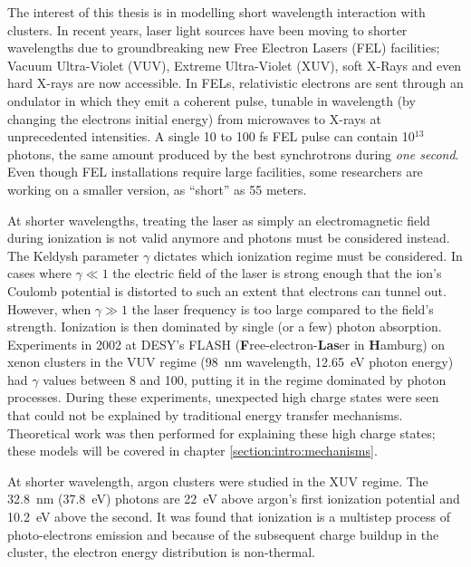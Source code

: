 The interest of this thesis is in modelling short wavelength interaction with
clusters. In recent years, laser light sources have been moving to shorter
wavelengths due to groundbreaking new Free Electron Lasers (FEL)
facilities; Vacuum Ultra-Violet (VUV), Extreme Ultra-Violet (XUV), soft X-Rays
and even hard X-rays are now accessible. In FELs, relativistic electrons are sent
through an ondulator in which they emit a coherent pulse, tunable in wavelength
(by changing the electrons initial energy)
from microwaves to X-rays\cite{Brabec2009,Ackermann2007a,Pellegrini2012} at
unprecedented intensities. A single 10 to 100 fs FEL pulse can contain 10$^{13}$
photons, the same amount produced by the best synchrotrons during
\textit{one second}\cite{Bostedt2009}. Even though FEL installations require
large facilities, some researchers are working on a smaller version, as
``short'' as 55 meters\cite{Shintake2008}.

At shorter wavelengths, treating the laser as simply an electromagnetic field
during ionization is not valid anymore and photons must be considered instead.
The Keldysh parameter $\gamma$ dictates which ionization regime must be considered. In
cases where $\gamma \ll 1$ the electric field of the laser is strong enough that
the ion's Coulomb potential is distorted to such an extent
that electrons can tunnel out.
However, when $\gamma \gg 1$ the laser frequency is too large compared to the
field's strength. Ionization is then dominated by single (or a few) photon
absorption.
Experiments in
2002\cite{Wabnitz2002,Bostedt2009} at
DESY's FLASH (\textbf{F}ree-electron-\textbf{Las}er in \textbf{H}amburg)
on xenon clusters in the VUV regime (98~nm wavelength, 12.65~eV photon energy)
had $\gamma$ values between 8 and
100, putting it in the regime dominated by photon processes.
During these experiments, unexpected high charge states were seen that could not
be explained by traditional energy transfer mechanisms. Theoretical work was
then performed for explaining these high charge states; these models will be
covered in chapter \ref{section:intro:mechanisms}.



At shorter wavelength,
argon clusters were studied in the XUV regime\cite{Bostedt2008}. The 32.8~nm
(37.8~eV) photons are 22~eV above argon's first ionization
potential and 10.2~eV  above the second. It was found that ionization is a multistep process of
photo-electrons emission and because of the subsequent charge buildup in the
cluster, the electron energy distribution is non-thermal.


